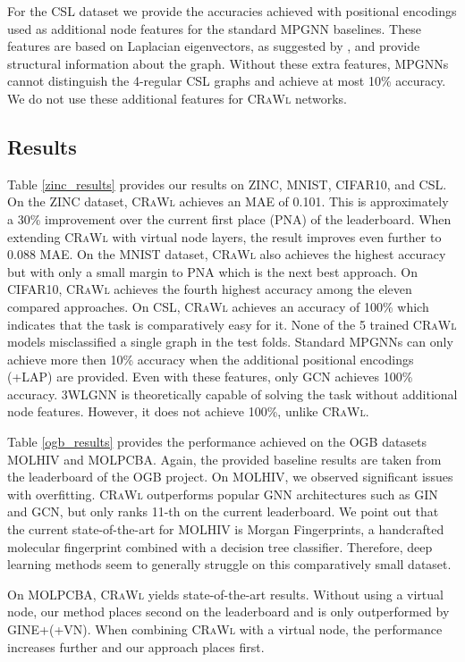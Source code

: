 \documentclass{scrartcl} \usepackage[dvipsnames]{xcolor}
\newcommand{\crawl}{\textsc{CRaWl}}
\begin{document}
For the CSL dataset we provide the accuracies achieved with positional encodings used as additional node features for the standard MPGNN baselines.
These features are based on Laplacian eigenvectors, as suggested by \citet{dwivedi2020benchmarkgnns}, and provide structural information about the graph. Without these extra features, MPGNNs cannot distinguish the 4-regular CSL graphs and achieve at most 10\% accuracy.
We do not use these additional features for \crawl{} networks. 

\subsection{Results}

Table \ref{zinc_results} provides our results on ZINC, MNIST, CIFAR10, and CSL.
On the ZINC dataset, \crawl{} achieves an MAE of 0.101.
This is approximately a 30\% improvement over the current first place (PNA) of the leaderboard.
When extending \crawl{} with virtual node layers, the result improves even further to 0.088 MAE.
On the MNIST dataset, \crawl{} also achieves the highest accuracy but with only a small margin to PNA which is the next best approach.
On CIFAR10, \crawl{} achieves the fourth highest accuracy among the eleven compared approaches.
On CSL, \crawl{} achieves an accuracy of 100\% which indicates that the task is comparatively easy for it.
None of the 5 trained \crawl{} models misclassified a single graph in the test folds.
Standard MPGNNs can only achieve more then 10\% accuracy when the additional positional encodings (+LAP) are provided.
Even with these features, only GCN achieves 100\% accuracy.
3WLGNN is theoretically capable of solving the task without additional node features.
However, it does not achieve 100\%, unlike \crawl{}.

Table \ref{ogb_results} provides the performance achieved on the OGB datasets MOLHIV and MOLPCBA.
Again, the provided baseline results are taken from the leaderboard of the OGB project.
On MOLHIV, we observed significant issues with overfitting.
\crawl{} outperforms popular GNN architectures such as GIN and GCN, but only ranks 11-th on the current leaderboard.
We point out that the current state-of-the-art for MOLHIV is Morgan Fingerprints, a handcrafted molecular fingerprint combined with a decision tree classifier.
Therefore, deep learning methods seem to generally struggle on this comparatively small dataset.

On MOLPCBA, \crawl{} yields state-of-the-art results.
Without using a virtual node, our method places second on the leaderboard and is only outperformed by GINE+(+VN).
When combining \crawl{} with a virtual node, the performance increases further and our approach places first.
\end{document}
